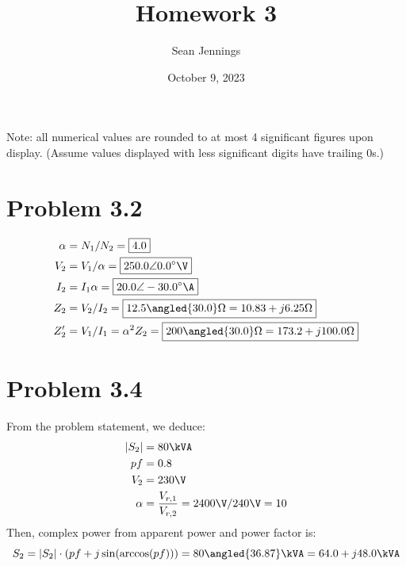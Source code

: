 \documentclass{homework}
\title{Homework 3}
\author{Sean Jennings}
\date{October 9, 2023}
\begin{document}
\maketitle

Note: all numerical values are rounded to at most 4 significant figures upon display.
(Assume values displayed with less significant digits have trailing 0s.)

\section{Problem 3.2}
\begin{align*}
    \alpha &= N_1 / N_2 = \boxed{4.0} \\
    V_2 &= V_1 / \alpha = \boxed{250.0 \angle 0.0 \degree \V} \\
    I_2 &= I_1 \alpha = \boxed{20.0 \angle -30.0 \degree \A} \\
    Z_2 &= V_2 / I_2 = \boxed{12.5 \angled{30.0} \ohm = 10.83 + j 6.25 \ohm} \\
    Z_2' &= V_1 / I_1 = \alpha^2 Z_2 = \boxed{200 \angled{30.0} \ohm = 173.2 + j 100.0 \ohm} \\
\end{align*}

\section{Problem 3.4}
From the problem statement, we deduce:
\begin{align*}
    |S_2| &= 80\kVA \\
    pf &= 0.8 \\
    V_2 &= 230 \V \\
    \alpha &= \frac{V_{r,1}}{V_{r,2}} = 2400\V / 240 \V = 10
\end{align*}
Then, complex power from apparent power and power factor is:
\begin{equation*}
    S_2 = |S_2| \cdot (pf + j \sin(\arccos(pf)))
        = 80 \angled{36.87} \kVA = 64.0 + j 48.0 \kVA
\end{equation*}
\end{document}
